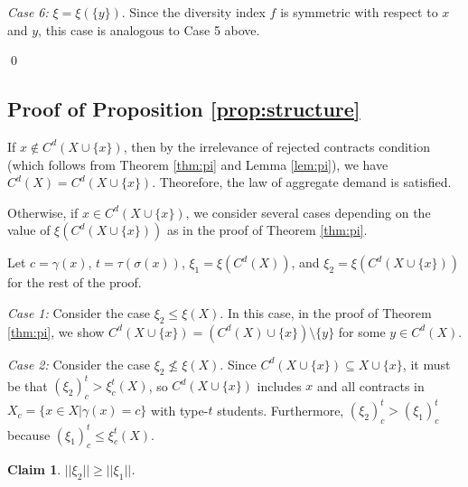 \documentclass[12pt]{amsart}
\newtheorem{claim}{Claim}
\theoremstyle{remark}
\newcommand{\norm}[1]{|| #1 ||}
\begin{document}
\medskip
\noindent
\emph{Case 6:} $\xi=\xi(\{y\})$. Since the diversity index $f$ is symmetric
with respect to $x$ and $y$, this case is analogous to Case 5 above.






\qed


\bigskip


\subsection*{Proof of Proposition \ref{prop:structure}}
If $x\notin C^d(X \cup \{x\})$, then by the irrelevance of rejected contracts condition (which follows from Theorem \ref{thm:pi} and Lemma \ref{lem:pi}),
we have $C^d(X)=C^d(X\cup\{x\})$. Theorefore, the law of aggregate demand is satisfied.

Otherwise, if $x\in C^d(X \cup \{x\})$, we consider several cases depending on the
value of $\xi(C^d(X\cup\{x\}))$ as in the proof of Theorem \ref{thm:pi}.

Let $c=\gamma(x)$, $t=\tau(\sigma(x))$, $\xi_1= \xi(C^d(X))$, and $\xi_2=\xi(C^d(X\cup\{x\}))$ for the rest of the proof.

\noindent
\emph{Case 1:} Consider the case $\xi_2 \leq \xi(X)$. In this case, in the proof of Theorem \ref{thm:pi},
we show $C^d(X \cup\{x\})= (C^d(X) \cup \{x\})\setminus \{y\}$ for some $y\in C^d(X)$.


\noindent
\emph{Case 2:} Consider the case $\xi_2 \not \leq \xi(X)$. Since $C^d(X\cup \{x\})\subseteq X\cup \{x\}$,
it must be that $(\xi_2)^t_c> \xi^t_c(X)$, so $C^d(X\cup \{x\})$ includes $x$ and all
contracts in $X_c=\{x\in X|\gamma(x)=c\}$ with type-$t$ students. Furthermore, $(\xi_2)^t_c>(\xi_1)^t_c$ because $(\xi_1)^t_c\leq \xi^t_c(X)$.

\begin{claim}\label{claim:norm}
$\norm{\xi_2}\geq \norm{\xi_1}$.
\end{claim}
\end{document}
